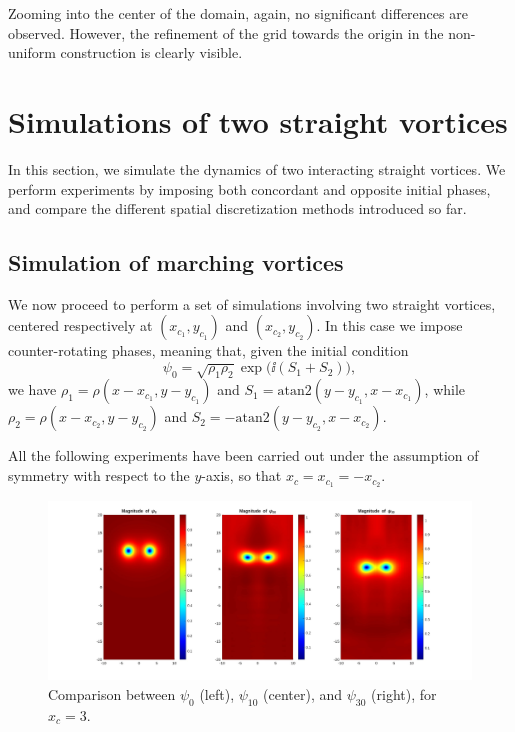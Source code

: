 Zooming into the center of the domain, again, no significant differences are observed. However, the refinement of the grid towards the origin in the non-uniform construction is clearly visible.

\section{Simulations of two straight vortices}

In this section, we simulate the dynamics of two interacting straight vortices. We perform experiments by imposing both concordant and opposite initial phases, and compare the different spatial discretization methods introduced so far.

\subsection{Simulation of marching vortices}

We now proceed to perform a set of simulations involving two straight vortices, centered respectively at $(x_{c_1}, y_{c_1})$ and $(x_{c_2}, y_{c_2})$. In this case we impose counter-rotating phases, meaning that, given the initial condition 
\[
    \psi_0 = \sqrt{\rho_1 \rho_2}\exp\bigl(\ii (S_1 + S_2)\bigr),
\] 
we have $\rho_1 = \rho(x - x_{c_1}, y - y_{c_1})$ and $S_1 = \mathrm{atan2}(y - y_{c_1}, x - x_{c_1})$, while $\rho_2 = \rho(x - x_{c_2}, y - y_{c_2})$ and $S_2 = -\mathrm{atan2}(y - y_{c_2}, x - x_{c_2})$.

All the following experiments have been carried out under the assumption of symmetry with respect to the $y$-axis, so that $x_c = x_{c_1} = -x_{c_2}$.

\begin{figure}[H]
    \centering
    \includegraphics[width=\textwidth]{img/str_01030_3.pdf}
    \caption{Comparison between $\psi_0$ (left), $\psi_{10}$ (center), and $\psi_{30}$ (right), for $x_c = 3$.}
\end{figure}

